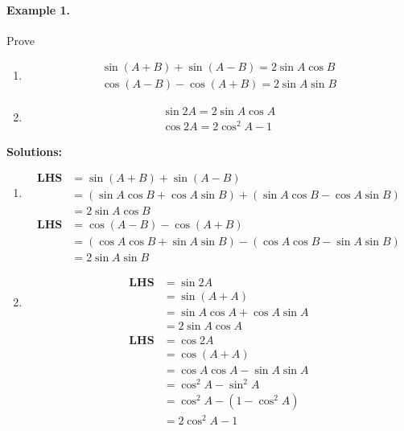 \documentclass{article}
\begin{document}
\paragraph{Example 1.}
Prove

\begin{enumerate}[label=\roman*)]
  \item
  \[
    \begin{aligned}
      \sin(A+B) + \sin(A-B) = 2\sin A \cos B \\
      \cos(A-B) - \cos(A+B) = 2\sin A \sin B
    \end{aligned}
  \]
  \item
  \[
    \begin{aligned}
      \sin 2A = 2\sin A \cos A \\
      \cos 2A = 2\cos^{2}A - 1
    \end{aligned}
  \]
\end{enumerate}

{\scriptsize \textbf{Solutions:}}

\begin{enumerate}[label=\roman*)]
  \item
  \[
    \begin{aligned}
      \textbf{LHS} &= \sin(A+B) + \sin(A-B) \\
      &=(\sin A \cos B + \cos A \sin B) + (\sin A \cos B - \cos A \sin B) \\
      &= 2\sin A \cos B
    \end{aligned}
  \]
  \[
    \begin{aligned}
      \textbf{LHS} &= \cos(A-B) - \cos(A+B) \\
      &=(\cos A \cos B + \sin A \sin B) - (\cos A \cos B - \sin A \sin B) \\
      &= 2\sin A \sin B
    \end{aligned}
  \]
  \item
  \[
    \begin{aligned}
      \textbf{LHS} &= \sin 2A \\
                   &=\sin(A+A) \\
                   &= \sin A \cos A + \cos A \sin A \\
                   &= 2\sin A \cos A
    \end{aligned}
  \]
  \[
    \begin{aligned}
      \textbf{LHS} &= \cos 2A \\
                   &=\cos(A+A) \\
                   &= \cos A \cos A - \sin A \sin A \\
                   &= \cos^{2}A - \sin^{2}A \\
                   &= \cos^{2}A - (1 - \cos^{2}A) \\
                   &= 2\cos^{2}A - 1
    \end{aligned}
  \]
\end{enumerate}
\end{document}
